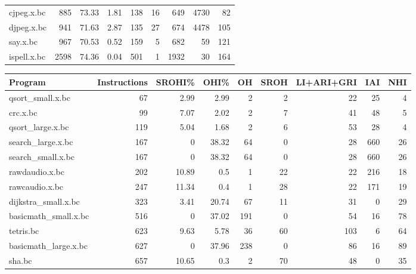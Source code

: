 \begin{tabular}{lrrrrrrrr}
 cjpeg.x.bc           &      885 &    73.33 &   1.81 &  138 &   16 &    649 &  4730 &    82 \\
 djpeg.x.bc           &      941 &    71.63 &   2.87 &  135 &   27 &    674 &  4478 &   105 \\
 say.x.bc             &      967 &    70.53 &   0.52 &  159 &    5 &    682 &    59 &   121 \\
 ispell.x.bc          &     2598 &    74.36 &   0.04 &  501 &    1 &   1932 &    30 &   164 \\
\hline
\end{tabular}\begin{tabular}{lrrrrrrrr}
\hline
 Program              &   Instructions &   SROHI\% &   OHI\% &   OH &   SROH &   LI+ARI+GRI &   IAI &   NHI \\
\hline
 qsort\_small.x.bc     &             67 &     2.99 &   2.99 &    2 &      2 &           22 &    25 &     4 \\
 crc.x.bc             &             99 &     7.07 &   2.02 &    2 &      7 &           41 &    48 &     5 \\
 qsort\_large.x.bc     &            119 &     5.04 &   1.68 &    2 &      6 &           53 &    28 &     4 \\
 search\_large.x.bc    &            167 &     0    &  38.32 &   64 &      0 &           28 &   660 &    26 \\
 search\_small.x.bc    &            167 &     0    &  38.32 &   64 &      0 &           28 &   660 &    26 \\
 rawdaudio.x.bc       &            202 &    10.89 &   0.5  &    1 &     22 &           22 &   216 &    18 \\
 rawcaudio.x.bc       &            247 &    11.34 &   0.4  &    1 &     28 &           22 &   171 &    19 \\
 dijkstra\_small.x.bc  &            323 &     3.41 &  20.74 &   67 &     11 &           31 &     0 &    29 \\
 basicmath\_small.x.bc &            516 &     0    &  37.02 &  191 &      0 &           54 &    16 &    78 \\
 tetris.bc            &            623 &     9.63 &   5.78 &   36 &     60 &          103 &     6 &    64 \\
 basicmath\_large.x.bc &            627 &     0    &  37.96 &  238 &      0 &           86 &    16 &    89 \\
 sha.bc               &            657 &    10.65 &   0.3  &    2 &     70 &           48 &     0 &    35 \\

\end{tabular}
